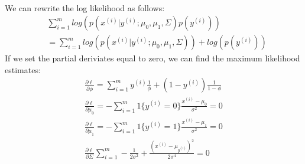 \begin{answer}\\
    We can rewrite the log likelihood as follows:
    $$
        \begin{aligned}
             & \sum_{i=1}^m log(p(x^{(i)} | y^{(i)}; \mu_{0}, \mu_1, \Sigma) p(y^{(i)}))          \\
             & = \sum_{i=1}^m log(p(x^{(i)} | y^{(i)}; \mu_{0}, \mu_1, \Sigma)) + log(p(y^{(i)}))
        \end{aligned}
    $$
    If we set the partial deriviates equal to zero, we can find the maximum likelihood estimates:
    $$
        \begin{aligned}
            \frac{\partial \ell}{\partial \phi} =\sum_{i=1}^{m} y^{(i)}\frac{1}{\phi} + (1-y^{(i)})\frac{1}{1-\phi} \\ %
            \frac{\partial \ell}{\partial \mu_0} = - \sum_{i=1}^m1\{y^{(i)} = 0\} \frac{x^{(i)} - \mu_0}{\sigma^2} = 0\\
            \frac{\partial \ell}{\partial \mu_1} =- \sum_{i=1}^m1\{y^{(i)} = 1\} \frac{x^{(i)} - \mu_1}{\sigma^2} = 0\\
            \frac{\partial \ell}{\partial \Sigma} \sum_{i=1}^m -\frac{1}{2\sigma^2} + \frac{(x^{(i)} - \mu_{y^{(i)}})^2}{2\sigma^4} = 0
        \end{aligned}
    $$
\end{answer}
